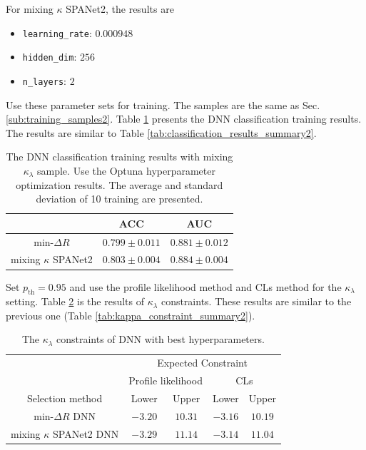 \documentclass[12pt]{article}
\begin{document}
		For mixing $\kappa$ SPANet2, the results are
		\begin{itemize}
			\item \verb+learning_rate+: $0.000948$ 
			\item \verb+hidden_dim+: $256$ 
			\item \verb+n_layers+: $2$ 
		\end{itemize}

		Use these parameter sets for training. The samples are the same as Sec. \ref{sub:training_samples2}. Table \ref{tab:DNN_best_hp_cls_results} presents the DNN classification training results. The results are similar to Table \ref{tab:classification_results_summary2}.
		\begin{table}[htpb]
			\centering
			\caption{The DNN classification training results with mixing $\kappa_\lambda$ sample. Use the Optuna hyperparameter optimization results. The average and standard deviation of 10 training are presented.}
			\label{tab:DNN_best_hp_cls_results}
			\begin{tabular}{c|cc}
				& ACC     & AUC   \\ \hline
				$\text{min-}\Delta R$   & $0.799 \pm 0.011$ & $0.881 \pm 0.012$ \\
				mixing $\kappa$ SPANet2 & $0.803 \pm 0.004$ & $0.884 \pm 0.004$
			\end{tabular}      
		\end{table}

		Set $p_\text{th} = 0.95$ and use the profile likelihood method and CLs method for the $\kappa_\lambda$ setting. Table \ref{tab:kappa_constraint_DNN_best_hp} is the results of $\kappa_\lambda$ constraints. These results are similar to the previous one (Table \ref{tab:kappa_constraint_summary2}).
		\begin{table}[htpb]
			\centering
			\caption{The $\kappa_\lambda$ constraints of DNN with best hyperparameters.}
			\label{tab:kappa_constraint_DNN_best_hp}
			\begin{tabular}{c|cc|cc}
								  & \multicolumn{4}{c}{Expected Constraint}                          \\
								  & \multicolumn{2}{c}{Profile likelihood} & \multicolumn{2}{c}{CLs} \\ \hline
			Selection method      & Lower              & Upper             & Lower      & Upper      \\ \hline
			$\text{min-}\Delta R$ DNN   & $-3.20$            & $10.31$            & $-3.16$      & $10.19$      \\
			mixing $\kappa$ SPANet2 DNN & $-3.29$            & $11.14$            & $-3.14$      & $11.04$      \\
			\end{tabular}
		\end{table}
\end{document}
